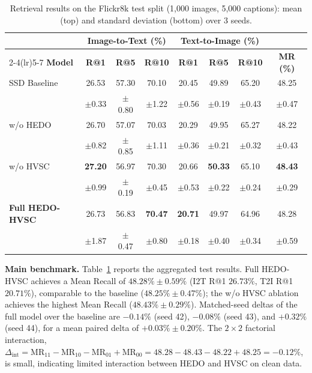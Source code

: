 \documentclass[pdflatex,sn-mathphys-num]{sn-jnl}
\begin{document}
\begin{table}[t]
\centering
\caption{Retrieval results on the Flickr8k test split (1,000 images, 5,000 captions): mean (top) and standard deviation (bottom) over 3 seeds.}
\label{tab:main_results}
\footnotesize
\setlength{\tabcolsep}{4pt}
\begin{tabular}{@{}lccccccc@{}}
\toprule
& \multicolumn{3}{c}{\textbf{Image-to-Text (\%)}} & \multicolumn{3}{c}{\textbf{Text-to-Image (\%)}} & \\
\cmidrule(lr){2-4}\cmidrule(lr){5-7}
\textbf{Model} & \textbf{R@1} & \textbf{R@5} & \textbf{R@10} & \textbf{R@1} & \textbf{R@5} & \textbf{R@10} & \textbf{MR (\%)} \\
\midrule
SSD Baseline & 26.53 & 57.30 & 70.10 & 20.45 & 49.89 & 65.20 & 48.25 \\
 & {\scriptsize$\pm$0.33} & {\scriptsize$\pm$0.80} & {\scriptsize$\pm$1.22} & {\scriptsize$\pm$0.56} & {\scriptsize$\pm$0.19} & {\scriptsize$\pm$0.43} & {\scriptsize$\pm$0.47} \\
w/o HEDO & 26.70 & 57.07 & 70.03 & 20.29 & 49.95 & 65.27 & 48.22 \\
 & {\scriptsize$\pm$0.82} & {\scriptsize$\pm$0.85} & {\scriptsize$\pm$1.11} & {\scriptsize$\pm$0.36} & {\scriptsize$\pm$0.21} & {\scriptsize$\pm$0.32} & {\scriptsize$\pm$0.43} \\
w/o HVSC & \textbf{27.20} & 56.97 & 70.30 & 20.66 & \textbf{50.33} & 65.10 & \textbf{48.43} \\
 & {\scriptsize$\pm$0.99} & {\scriptsize$\pm$0.19} & {\scriptsize$\pm$0.45} & {\scriptsize$\pm$0.53} & {\scriptsize$\pm$0.22} & {\scriptsize$\pm$0.24} & {\scriptsize$\pm$0.29} \\
\textbf{Full HEDO-HVSC} & 26.73 & 56.83 & \textbf{70.47} & \textbf{20.71} & 49.97 & 64.96 & 48.28 \\
 & {\scriptsize$\pm$1.87} & {\scriptsize$\pm$0.47} & {\scriptsize$\pm$0.80} & {\scriptsize$\pm$0.18} & {\scriptsize$\pm$0.40} & {\scriptsize$\pm$0.34} & {\scriptsize$\pm$0.59} \\
\bottomrule
\end{tabular}
\end{table}

\textbf{Main benchmark.} Table~\ref{tab:main_results} reports the aggregated test results. Full HEDO-HVSC achieves a Mean Recall of $48.28\% \pm 0.59\%$ (I2T R@1 $26.73\%$, T2I R@1 $20.71\%$), comparable to the baseline ($48.25\% \pm 0.47\%$); the w/o HVSC ablation achieves the highest Mean Recall ($48.43\% \pm 0.29\%$). Matched-seed deltas of the full model over the baseline are $-0.14\%$ (seed 42), $-0.08\%$ (seed 43), and $+0.32\%$ (seed 44), for a mean paired delta of $+0.03\% \pm 0.20\%$. The $2 \times 2$ factorial interaction, $\Delta_{\text{int}} = \text{MR}_{11} - \text{MR}_{10} - \text{MR}_{01} + \text{MR}_{00} = 48.28 - 48.43 - 48.22 + 48.25 = -0.12\%$, is small, indicating limited interaction between HEDO and HVSC on clean data.
\end{document}
